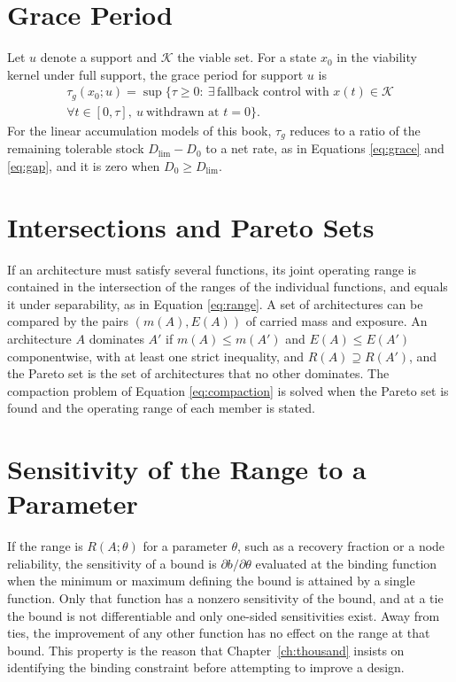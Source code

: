 \documentclass[11pt,openany]{book}
\theoremstyle{definition}
\theoremstyle{remark}
\newcommand{\Kset}{\mathcal{K}}
\begin{document}
\section{Grace Period}

Let $u$ denote a support and $\Kset$ the viable set. For a state $x_0$ in the viability kernel under full support, the grace period for support $u$ is
\begin{multline*}
\tau_g(x_0;u)=\sup\{\tau\ge0:\ \exists\,\text{fallback control with }x(t)\in\Kset\\ \forall t\in[0,\tau],\ u\ \text{withdrawn at } t=0\}.
\end{multline*}
For the linear accumulation models of this book, $\tau_g$ reduces to a ratio of the remaining tolerable stock $D_{\lim}-D_0$ to a net rate, as in Equations \eqref{eq:grace} and \eqref{eq:gap}, and it is zero when $D_0\ge D_{\lim}$.

\section{Intersections and Pareto Sets}

If an architecture must satisfy several functions, its joint operating range is contained in the intersection of the ranges of the individual functions, and equals it under separability, as in Equation \eqref{eq:range}. A set of architectures can be compared by the pairs $(m(A),E(A))$ of carried mass and exposure. An architecture $A$ dominates $A'$ if $m(A)\le m(A')$ and $E(A)\le E(A')$ componentwise, with at least one strict inequality, and $R(A)\supseteq R(A')$, and the Pareto set is the set of architectures that no other dominates. The compaction problem of Equation \eqref{eq:compaction} is solved when the Pareto set is found and the operating range of each member is stated.

\section{Sensitivity of the Range to a Parameter}

If the range is $R(A;\theta)$ for a parameter $\theta$, such as a recovery fraction or a node reliability, the sensitivity of a bound is $\partial b/\partial\theta$ evaluated at the binding function when the minimum or maximum defining the bound is attained by a single function. Only that function has a nonzero sensitivity of the bound, and at a tie the bound is not differentiable and only one-sided sensitivities exist. Away from ties, the improvement of any other function has no effect on the range at that bound. This property is the reason that Chapter~\ref{ch:thousand} insists on identifying the binding constraint before attempting to improve a design.
\end{document}
